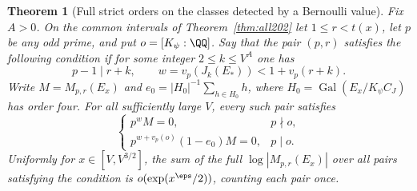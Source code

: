 \documentclass[a4paper,11pt]{article}
\newtheorem{theorem}[proposition]{Theorem}
\theoremstyle{definition}
\theoremstyle{remark}
\numberwithin{equation}{section}
\begin{document}
\begin{theorem}[Full strict orders on the classes detected by a Bernoulli value]
\leavevmode\label{thm:full231}
Fix \(A>0\). On the common intervals of Theorem~\ref{thm:all202}
let \(1\le r<t(x)\), let \(p\) be any odd prime, and put
\(o=[K_\psi:\QQ]\). Say that the pair \((p,r)\) satisfies the
following condition if for some integer \(2\le k\le V^A\) one has
\[
    p-1\mid r+k, \qquad w=v_p(J_k(E_*))<1+v_p(r+k).
\]
Write \(M=M_{p,r}(E_x)\) and \(e_0=|H_0|^{-1}\sum_{h\in H_0}h\),
where \(H_0=\operatorname{Gal}(E_x/K_\psi C_J)\) has order four.
For all sufficiently large \(V\), every such pair satisfies
\[
 \begin{cases}
      p^wM=0, &p\nmid o,\\
      p^{w+v_p(o)}(1-e_0)M=0, &p\mid o.
 \end{cases}
\]
Uniformly for \(x\in[V,V^{3/2}]\), the sum of the full
\(\log|M_{p,r}(E_x)|\) over all pairs satisfying the condition
is \(o(\exp(x^\eps/2))\), counting each pair once.
\end{theorem}
\end{document}
